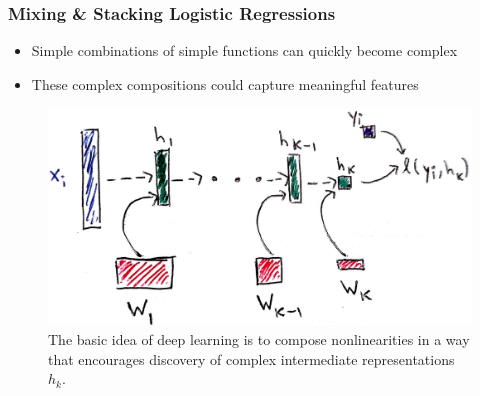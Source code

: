 \documentclass[10pt,mathserif]{beamer}
\begin{document}
\begin{frame}
  \frametitle{Mixing \& Stacking Logistic Regressions}
  \begin{itemize}
  \item Simple combinations of simple functions can quickly become complex
  \item These complex compositions could capture meaningful features
  \end{itemize}
  \begin{figure}
    \centering
    \includegraphics[width=0.7\paperwidth]{figure/deep_learning_basic}
    \caption{The basic idea of deep learning is to compose nonlinearities in a
      way that encourages discovery of complex intermediate representations
      $h_k$.
      \label{fig:deep_learning_basic} }
  \end{figure}
\end{frame}
\end{document}
